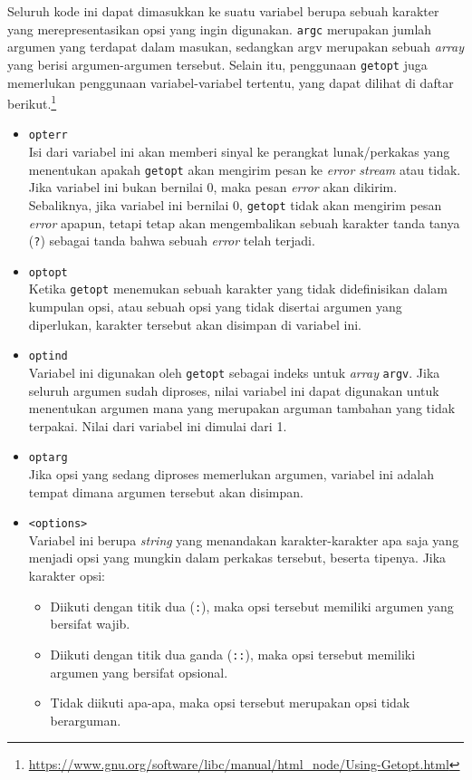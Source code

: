 Seluruh kode ini dapat dimasukkan ke suatu variabel berupa sebuah karakter yang merepresentasikan opsi yang ingin digunakan. \verb|argc| merupakan jumlah argumen yang terdapat dalam masukan, sedangkan argv merupakan sebuah \textit{array} yang berisi argumen-argumen tersebut.
\newline\newline
Selain itu, penggunaan \verb|getopt| juga memerlukan penggunaan variabel-variabel tertentu, yang dapat dilihat di daftar berikut.\footnote{\href{https://www.gnu.org/software/libc/manual/html\_node/Using-Getopt.html}{https://www.gnu.org/software/libc/manual/html\_node/Using-Getopt.html}}
\begin{itemize}
	\item \verb|opterr|\\
	Isi dari variabel ini akan memberi sinyal ke perangkat lunak/perkakas yang menentukan apakah \verb|getopt| akan mengirim pesan ke \textit{error stream} atau tidak. Jika variabel ini bukan bernilai 0, maka pesan \textit{error} akan dikirim. Sebaliknya, jika variabel ini bernilai 0, \verb|getopt| tidak akan mengirim pesan \textit{error} apapun, tetapi tetap akan mengembalikan sebuah karakter tanda tanya (\verb|?|) sebagai tanda bahwa sebuah \textit{error} telah terjadi.
	\item \verb|optopt|\\
	Ketika \verb|getopt| menemukan sebuah karakter yang tidak didefinisikan dalam kumpulan opsi, atau sebuah opsi yang tidak disertai argumen yang diperlukan, karakter tersebut akan disimpan di variabel ini.
	\item \verb|optind|\\
	Variabel ini digunakan oleh \verb|getopt| sebagai indeks untuk \textit{array} \verb|argv|. Jika seluruh argumen sudah diproses, nilai variabel ini dapat digunakan untuk menentukan argumen mana yang merupakan arguman tambahan yang tidak terpakai. Nilai dari variabel ini dimulai dari 1.
	\item \verb|optarg|\\
	Jika opsi yang sedang diproses memerlukan argumen, variabel ini adalah tempat dimana argumen tersebut akan disimpan.
	\item \verb|<options>|\\
	Variabel ini berupa \textit{string} yang menandakan karakter-karakter apa saja yang menjadi opsi yang mungkin dalam perkakas tersebut, beserta tipenya. Jika karakter opsi:
	
	\begin{itemize}
		\item Diikuti dengan titik dua (\verb|:|), maka opsi tersebut memiliki argumen yang bersifat wajib.
		\item Diikuti dengan titik dua ganda (\verb|::|), maka opsi tersebut memiliki argumen yang bersifat opsional.
		\item Tidak diikuti apa-apa, maka opsi tersebut merupakan opsi tidak berarguman.
	\end{itemize}
	
\end{itemize}

